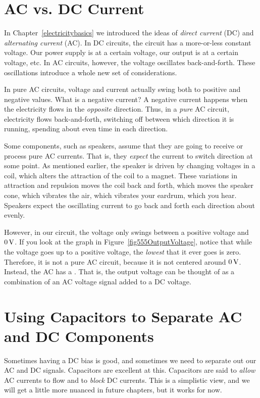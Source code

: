 \section{AC vs. DC Current}

In Chapter~\ref{electricitybasics} we introduced the ideas of \emph{direct current} (DC) and \emph{alternating current} (AC).  
In DC circuits, the circuit has a more-or-less constant voltage.
Our power supply is at a certain voltage, our output is at a certain voltage, etc.
In AC circuits, however, the voltage oscillates back-and-forth.
These oscillations introduce a whole new set of considerations.

In pure AC circuits, voltage and current actually swing both to positive and negative values.
What is a negative current?
A negative current happens when the electricity flows in the \emph{opposite} direction.
Thus, in a \emph{pure} AC circuit, electricity flows back-and-forth, switching off between which direction it is running, spending about even time in each direction.

Some components, such as speakers, assume that they are going to receive or process pure AC currents.
That is, they \emph{expect} the current to switch direction at some point.
As mentioned earlier, the speaker is driven by changing voltages in a coil, which alters the attraction of the coil to a magnet.
These variations in attraction and repulsion moves the coil back and forth, which moves the speaker cone, which vibrates the air, which vibrates your eardrum, which you hear.
Speakers expect the oscillating current to go back and forth each direction about evenly.

However, in our circuit, the voltage only swings between a positive voltage and $0\,\si{\volt}$.
If you look at the graph in Figure~\ref{fig555OutputVoltage}, notice that while the voltage goes up to a positive voltage, the \emph{lowest} that it ever goes is zero.
Therefore, it is not a pure AC circuit, because it is not centered around $0\,\si{\volt}$.
Instead, the AC has a . 
That is, the output voltage can be thought of as a combination of an AC voltage signal added to a DC voltage.


\section{Using Capacitors to Separate AC and DC Components}

Sometimes having a DC bias is good, and sometimes we need to separate out our AC and DC signals.
Capacitors are excellent at this.  
Capacitors are said to \emph{allow} AC currents to flow and to \emph{block} DC currents.
This is a simplistic view, and we will get a little more nuanced in future chapters, but it works for now.

